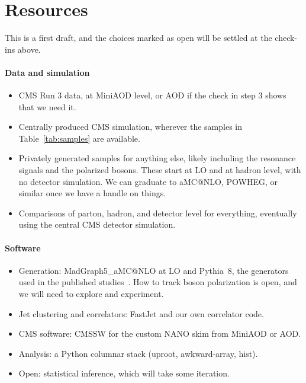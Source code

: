 \documentclass[11pt]{article}
\begin{document}
\section{Resources}

This is a first draft, and the choices marked as open will be settled at the check-ins above.

\paragraph{Data and simulation}
\begin{itemize}
    \item CMS Run 3 data, at MiniAOD level, or AOD if the check in step 3 shows that we need it.
    \item Centrally produced CMS simulation, wherever the samples in Table~\ref{tab:samples} are available.
    \item Privately generated samples for anything else, likely including the resonance signals and the polarized bosons. These start at LO and at hadron level, with no detector simulation. We can graduate to aMC@NLO, POWHEG, or similar once we have a handle on things.
    \item Comparisons of parton, hadron, and detector level for everything, eventually using the central CMS detector simulation.
\end{itemize}

\paragraph{Software}
\begin{itemize}
    \item Generation: MadGraph5\_aMC@NLO at LO and Pythia~8, the generators used in the published studies~\cite{Gao:2026hoj,Ricci:2026fkj}. How to track boson polarization is open, and we will need to explore and experiment.
    \item Jet clustering and correlators: FastJet and our own correlator code.
    \item CMS software: CMSSW for the custom NANO skim from MiniAOD or AOD.
    \item Analysis: a Python columnar stack (uproot, awkward-array, hist).
    \item Open: statistical inference, which will take some iteration.
\end{itemize}
\end{document}
